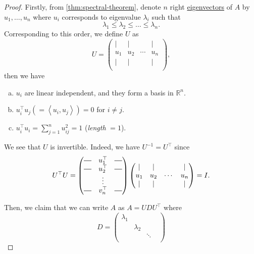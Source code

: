 \begin{proof}
	Firstly, from \autoref{thm:spectral-theorem}, denote \(n\) right \hyperref[def:eigenvector]{eigenvectors} of \(A\) by \(u_1, \dots , u_n\) where \(u_{i} \) corresponds to eigenvalue \(\lambda _i\) such that
	\[
		\lambda _1 \leq \lambda _2 \leq \dots  \leq \lambda _n.
	\]
	Corresponding to this order, we define \(U\) as
	\[
		U = \begin{pmatrix}
			\mid & \mid &        & \mid \\
			u_1  & u_2  & \cdots & u_n  \\
			\mid & \mid &        & \mid \\
		\end{pmatrix},
	\]
	then we have
	\begin{enumerate}[(a)]
		\item \(u_i\) are linear independent, and they form a basis in \(\mathbb{R} ^n\).
		\item \(u_{i} ^{\top} u_{j} ( = \left< u_{i} , u_{j}  \right> ) = 0\) for \(i\neq j\).
		\item \(u_{i} ^{\top} u_{i} = \sum_{j=1}^{n} u_{ij}^{2} = 1 \) (\emph{length} \(= 1\)).
	\end{enumerate}
	\begin{remark}[\(U\) is invertible]
		We see that \(U\) is invertible. Indeed, we have \(U^{-1} = U^{\top} \) since
		\[
			U^{\top}U = \begin{pmatrix}
				\horzbar & u^{\top}_1 & \horzbar \\
				\horzbar & u^{\top}_2 & \horzbar \\
				         & \vdots     &          \\
				\horzbar & v^{\top}_n & \horzbar \\
			\end{pmatrix}\begin{pmatrix}
				\mid & \mid &        & \mid \\
				u_1  & u_2  & \cdots & u_n  \\
				\mid & \mid &        & \mid \\
			\end{pmatrix} = I.
		\]
	\end{remark}
	Then, we claim that we can write \(A\) as \(A = U D U^{\top}\) where \[
		D  = \begin{pmatrix}
			\lambda_1 &           &        &           \\
			          & \lambda_2 &        &           \\
			          &           & \ddots &           \\

\end{pmatrix}\]
\end{proof}
